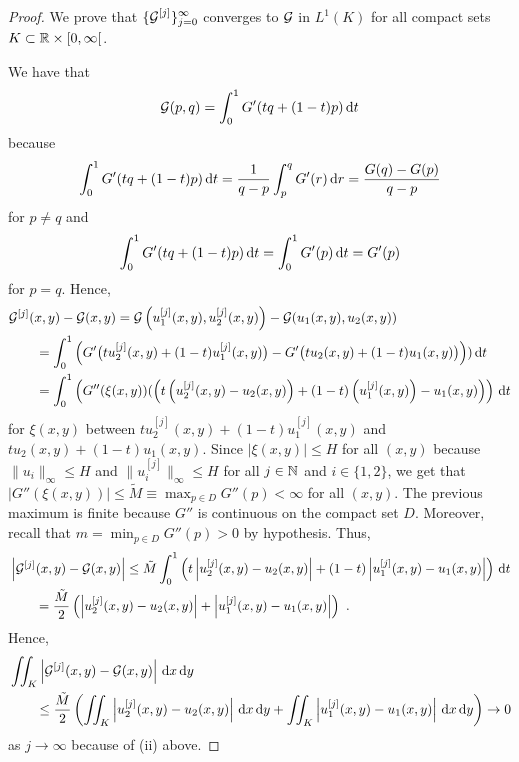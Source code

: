 \begin{proof}
  We prove that $\displaystyle \{ {\cal G}^{[j]} \}_{j=0}^\infty$
converges to ${\cal G}$ in $\displaystyle L^1(K)$ for all compact
sets $K \subset \mathbb{R} \times [0,\infty[$.

We have that
\begin{equation} \label{shock_uniqueEq9}
{\cal G}(p,q) = \int_0^1 G'(t q + (1-t) p) \,\mathrm{d}{t}
\end{equation}
because
\[
\int_0^1 G'(tq  + (1-t) p) \,\mathrm{d}{t}
= \frac{1}{q - p} \int_{p}^{q} G'(r) \,\mathrm{d}{r} 
= \frac{G(q) - G(p)}{q - p}
\]
for $p \neq q$ and
\[
\int_0^1 G'(t q + (1-t) p) \,\mathrm{d}{t} = \int_0^1 G'(p) \,\mathrm{d}{t} = G'(p)
\]
for $p = q$.  Hence,
\begin{align*}
&{\cal G}^{[j]}(x,y) - {\cal G}(x,y)
= {\cal G}\left(u_1^{[j]}(x,y),u_2^{[j]}(x,y)\right)
- {\cal G}(u_1(x,y),u_2(x,y)) \\
&\qquad = \int_0^1 \left( G'\big(t u_2^{[j]}(x,y) + (1-t) u_1^{[j]}(x,y)\big)
- G'\big(t u_2(x,y) + (1-t) u_1(x,y)\big) \right)) \,\mathrm{d}{t} \\
&\qquad = \int_0^1 \left( G''(\xi(x,y))
(\left(t \left(u_2^{[j]}(x,y)-u_2(x,y)\right)
+ (1-t) \left( u_1^{[j]}(x,y)\right) - u_1(x,y)\right) \right) \,\mathrm{d}{t}
\end{align*}
for $\xi(x,y)$ between
$\displaystyle t u_2^{[j]}(x,y) + (1-t) u_1^{[j]}(x,y)$
and $t u_2(x,y) + (1-t) u_1(x,y)$.  Since $|\xi(x,y)| \leq H$ for all
$(x,y)$ because $\displaystyle \|u_i\|_\infty \leq H$ and
$\displaystyle \|u_i^{[j]}\|_\infty \leq H$ for all $j\in \mathbb{N}$
and $i \in \{1,2\}$, we get that
$\displaystyle |G''(\xi(x,y))| \leq \tilde{M} \equiv
\max_{p \in D} G''(p) < \infty$ for all $(x,y)$.  The previous maximum
is finite because $G''$ is continuous on the compact set $D$.
Moreover, recall that
$\displaystyle m = \min_{p \in D} G''(p) >0$ by hypothesis.
Thus,
\begin{align*}
&\left| {\cal G}^{[j]}(x,y) - {\cal G}(x,y) \right|
\leq \tilde{M} \int_0^1 \left(t \left|u_2^{[j]}(x,y)-u_2(x,y)\right|
+ (1-t) \left|u_1^{[j]}(x,y) - u_1(x,y)\right| \right) \,\mathrm{d}{t} \\
& \qquad = \frac{\tilde{M}}{2}\left( \left|u_2^{[j]}(x,y)-u_2(x,y)\right|
+ \left|u_1^{[j]}(x,y) - u_1(x,y)\right| \right) \ .
\end{align*}
Hence,
\begin{align*}
&\iint_K\left| {\cal G}^{[j]}(x,y) - {\cal G}(x,y) \right| \,\mathrm{d}{x}\,\mathrm{d}{y} \\
&\qquad \leq \frac{\tilde{M}}{2}\left( \iint_K
\left|u_2^{[j]}(x,y)-u_2(x,y)\right| \,\mathrm{d}{x} \,\mathrm{d}{y}
+ \iint_K \left|u_1^{[j]}(x,y) - u_1(x,y)\right| \,\mathrm{d}{x} \,\mathrm{d}{y} \right) \to 0  
\end{align*}
as $j \to \infty$ because of (ii) above.


\end{proof}
